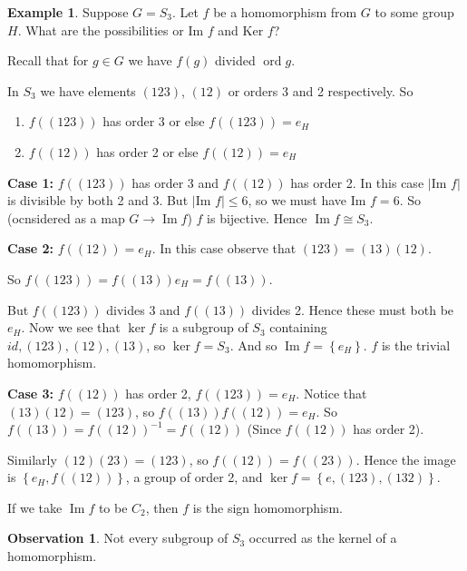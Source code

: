 \documentclass{article}
\theoremstyle{definition}
\newtheorem*{exmp}{Example}
\newtheorem*{obvs}{Observation}
\DeclareMathOperator{\Ima}{Im}
\DeclareMathOperator{\ord}{\text{ord}}
\begin{document}
\begin{exmp}
  Suppose $G=S_3$. Let $f$ be a homomorphism from $G$ to some group $H$. What are the possibilities or $\text{Im }f$ and $\text{Ker }f$?

  Recall that for $g \in G$ we have $f(g)$ divided $\ord g$.

  In $S_3$ we have elements $(123)$, $(12)$ or orders 3 and 2 respectively. So
  \begin{enumerate}
    \item 
  $f\left( (123) \right)$ has order 3 or else $f\left( (123) \right)=e_H$ 
    \item 
  $f\left( (12) \right)$ has order 2 or else $f\left( (12) \right)=e_H$ 
  \end{enumerate}

  \textbf{Case 1:} $f\left( (123) \right)$ has order 3 and $f\left(  (12)\right)$ has order 2. In this case $|\text{Im }f|$ is divisible by both 2 and 3. But $|\text{Im }f| \leq 6$, so we must have $\text{Im } f=6$. So (ocnsidered as a map $G \rightarrow \Ima f$) $f$ is bijective. Hence $\Ima f \cong S_3$.

  \textbf{Case 2:} $f\left( (12) \right)=e_H$. In this case observe that $(123)=(13)(12)$.

  So $f\left( (123) \right)=f\left( (13) \right)e_H=f\left( (13) \right)$.

  But $f\left( (123) \right)$ divides 3 and $f\left( (13) \right)$ divides 2. Hence these must both be $e_H$. Now we see that $\ker f$ is a subgroup of $S_3$ containing $id, (123), (12), (13)$, so $\ker f=S_3$. And so $\Ima f = \left\{ e_H \right\}$. $f$ is the trivial homomorphism.

  \textbf{Case 3:} $f\left( (12) \right)$ has order 2, $f\left( (123) \right)=e_H$. Notice that $(13)(12)=(123)$, so $f\left( (13) \right)f\left( (12) \right)=e_H$. So $f\left( (13) \right)=f\left( (12) \right)^{-1}=f\left( (12) \right)$ (Since $f\left( (12) \right)$ has order 2).

  Similarly $(12)(23)=(123)$, so $f\left( (12) \right)=f\left( (23) \right)$. Hence the image is $\left\{ e_H,f\left( (12) \right) \right\}$, a group of order 2, and $\ker f=\left\{ e,(123),(132) \right\}$.

  If we take $\Ima f$ to be $C_2$, then $f$ is the sign homomorphism.\\
\begin{obvs}
  
  Not every subgroup of $S_3$ occurred as the kernel of a homomorphism.
\end{obvs}
\end{exmp}
\end{document}
